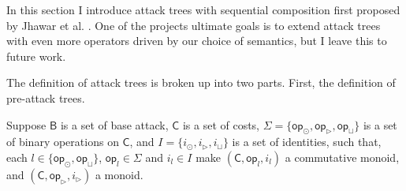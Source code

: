 In this section I introduce attack trees with sequential composition
first proposed by Jhawar et al. \cite{Jhawar:2015}.  One of the
projects ultimate goals is to extend attack trees with even more
operators driven by our choice of semantics, but I leave this to
future work.

The definition of attack trees is broken up into two parts.  First,
the definition of pre-attack trees.
\begin{definition}
  \label{def:atrees}
  Suppose $\mathsf{B}$ is a set of base attack, $\mathsf{C}$ is
  a set of costs, $\Sigma =
  \{\mathsf{op}_{\odot}, \mathsf{op}_\rhd, \mathsf{op}_\sqcup \}$ is a set of binary
  operations on $\mathsf{C}$, and $I = \{i_\odot, i_\rhd, i_\sqcup\}$ is a set of
  identities, such that, each $l \in \{ \mathsf{op}_{\odot}, \mathsf{op}_\sqcup \}$, $\mathsf{op}_l \in \Sigma$ and $i_l \in
  I$ make $(\mathsf{C}, \mathsf{op}_l, i_l)$ a commutative monoid, and
  $(\mathsf{C}, \mathsf{op}_\rhd, i_\rhd)$ a monoid.


\end{definition}
